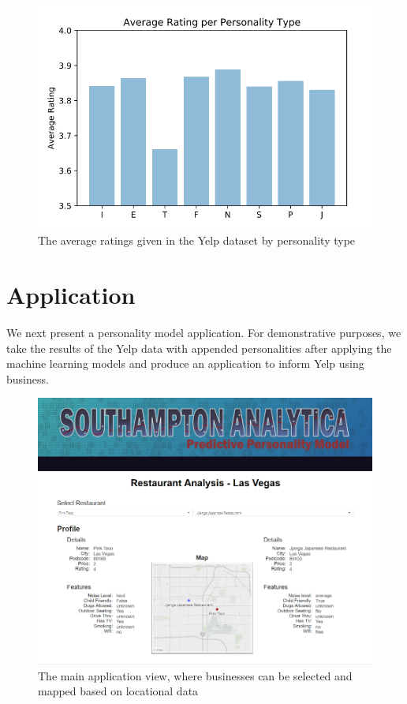 \documentclass[sigconf, nonacm]{acmart}
\begin{document}
\begin{center}
\begin{figure}
\includegraphics[width = 0.9\columnwidth]{ratings.png}
\caption{The average ratings given in the Yelp dataset  by personality type}
\label{ratings}
\end{figure}
\end{center}


\section{Application}

We next present a personality model application. For demonstrative purposes, we take the results of the Yelp data with appended personalities after applying the machine learning models and produce an application to inform Yelp using business. \\

\begin{center}
\begin{figure}
\includegraphics[width = 0.9 \columnwidth]{top_app}
\caption{The main application view, where businesses can be selected and mapped based on locational data}
\label{top_app}
\end{figure}
\end{center}
\end{document}
